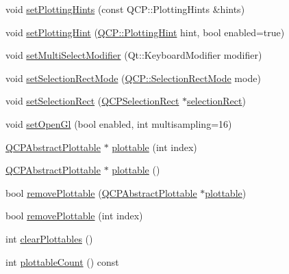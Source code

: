 \begin{DoxyCompactItemize}
void \mbox{\hyperlink{class_q_custom_plot_a94a33cbdadbbac5934843508bcfc210d}{set\+Plotting\+Hints}} (const Q\+C\+P\+::\+Plotting\+Hints \&hints)
\item 
void \mbox{\hyperlink{class_q_custom_plot_a3b7c97bb6c16464e9e15190c07abe9a9}{set\+Plotting\+Hint}} (\mbox{\hyperlink{namespace_q_c_p_a5400e5fcb9528d92002ddb938c1f4ef4}{Q\+C\+P\+::\+Plotting\+Hint}} hint, bool enabled=true)
\item 
void \mbox{\hyperlink{class_q_custom_plot_a8fc96e3b5138a06759a2a90c166df516}{set\+Multi\+Select\+Modifier}} (Qt\+::\+Keyboard\+Modifier modifier)
\item 
void \mbox{\hyperlink{class_q_custom_plot_a810ef958ebe84db661c7288b526c0deb}{set\+Selection\+Rect\+Mode}} (\mbox{\hyperlink{namespace_q_c_p_ac9aa4d6d81ac76b094f9af9ad2d3aacf}{Q\+C\+P\+::\+Selection\+Rect\+Mode}} mode)
\item 
void \mbox{\hyperlink{class_q_custom_plot_a0c09f96df15faa4799ad7051bb16cf33}{set\+Selection\+Rect}} (\mbox{\hyperlink{class_q_c_p_selection_rect}{Q\+C\+P\+Selection\+Rect}} $\ast$\mbox{\hyperlink{class_q_custom_plot_ad7df2bcbba307e644db383b449e31efd}{selection\+Rect}})
\item 
void \mbox{\hyperlink{class_q_custom_plot_a7db1adc09016329f3aef7c60da935789}{set\+Open\+Gl}} (bool enabled, int multisampling=16)
\item 
\mbox{\hyperlink{class_q_c_p_abstract_plottable}{Q\+C\+P\+Abstract\+Plottable}} $\ast$ \mbox{\hyperlink{class_q_custom_plot_a32de81ff53e263e785b83b52ecd99d6f}{plottable}} (int index)
\item 
\mbox{\hyperlink{class_q_c_p_abstract_plottable}{Q\+C\+P\+Abstract\+Plottable}} $\ast$ \mbox{\hyperlink{class_q_custom_plot_adea38bdc660da9412ba69fb939031567}{plottable}} ()
\item 
bool \mbox{\hyperlink{class_q_custom_plot_af3dafd56884208474f311d6226513ab2}{remove\+Plottable}} (\mbox{\hyperlink{class_q_c_p_abstract_plottable}{Q\+C\+P\+Abstract\+Plottable}} $\ast$\mbox{\hyperlink{class_q_custom_plot_a32de81ff53e263e785b83b52ecd99d6f}{plottable}})
\item 
bool \mbox{\hyperlink{class_q_custom_plot_afc210e0021480f8119bccf37839dbcc8}{remove\+Plottable}} (int index)
\item 
int \mbox{\hyperlink{class_q_custom_plot_a9a409bb3201878adb7ffba1c89c4e004}{clear\+Plottables}} ()
\item 
int \mbox{\hyperlink{class_q_custom_plot_a5f4f15991c14bf9ad659bb2a19dfbed4}{plottable\+Count}} () const
\item 

\end{DoxyCompactItemize}
